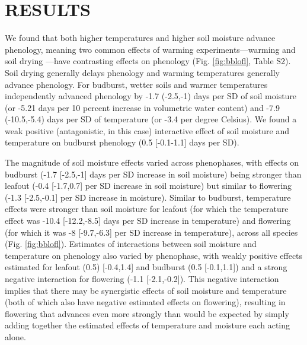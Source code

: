\documentclass{article}
\begin{document}
\section* {RESULTS}

\par We found that both higher temperatures and higher soil moisture advance phenology, meaning two common effects of warming experiments---warming and soil drying ---have contrasting effects on phenology (Fig. \ref{fig:bblofl}, Table S2). Soil drying generally delays phenology and warming temperatures generally advance phenology. For budburst, wetter soils and warmer temperatures independently advanced phenology by -1.7 (-2.5,-1) days per SD of soil moisture  (or -5.21 days per 10 percent increase in volumetric water content) and -7.9 (-10.5,-5.4) days per SD of temperature (or -3.4 per degree Celsius). We found a weak positive (antagonistic, in this case) interactive effect of soil moisture and temperature on budburst phenology (0.5 [-0.1-1.1] days per SD). %

\par The magnitude of soil moisture effects varied across phenophases, with effects on budburst (-1.7 [-2.5,-1] days per SD increase in soil moisture) being stronger than leafout (-0.4 [-1.7,0.7] per SD increase in soil moisture) but similar to flowering (-1.3 [-2.5,-0.1] per SD increase in moisture). Similar to budburst, temperature effects were stronger than soil moisture for leafout (for which the temperature effect was -10.4 [-12.2,-8.5] days per SD increase in temperature) and flowering (for which it was -8 [-9.7,-6.3] per SD increase in temperature), across all species (Fig. \ref{fig:bblofl}). Estimates of interactions between soil moisture and temperature on phenology also varied by phenophase, with weakly positive effects estimated for leafout (0.5) [-0.4,1.4] and budburst (0.5 [-0.1,1.1]) and a strong negative interaction for flowering (-1.1 [-2.1,-0.2]). This negative interaction implies that there may be synergistic effects of soil moisture and temperature (both of which also have negative estimated effects on flowering), resulting in flowering that advances even more strongly than would be expected by simply adding together the  estimated effects of temperature and  moisture each acting alone. 
\end{document}
